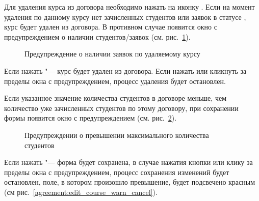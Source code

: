 \begin{itemize}
Для удаления курса из договора необходимо нажать на иконку  . 
Если на момент удаления по данному курсу нет зачисленных студентов или заявок в статусе , курс будет удален из договора. 
В противном случае появится окно с предупреждением о наличии студентов/заявок (см. рис.~\ref{agreement:edit_course_warn}).
	\begin{figure}[H]
		\caption{Предупреждение о наличии заявок по удаляемому курсу}
		\label{agreement:edit_course_warn}
	\end{figure}	
Если нажать  "--- курс будет удален из договора. Если нажать  или кликнуть за пределы окна с предупреждением, процесс удаления будет остановлен.

Если указанное значение количества студентов в договоре меньше, чем количество уже зачисленных студентов по этому договору, 
при сохранении формы появится окно с предупреждением (см. рис.~\ref{agreement:edit_course_warn_number}).

		\begin{figure}[H]
		\caption{Предупреждении о превышении максимального количества студентов}
		\label{agreement:edit_course_warn_number}
		\end{figure}
		
Если нажать  "--- форма будет сохранена, в случае нажатия кнопки  или клику за пределы окна с предупреждением, процесс сохранения изменений будет остановлен, поле, в котором произошло превышение, будет подсвечено красным (см рис.~\ref{agreement:edit_course_warn_cancel}).	


\end{itemize}
